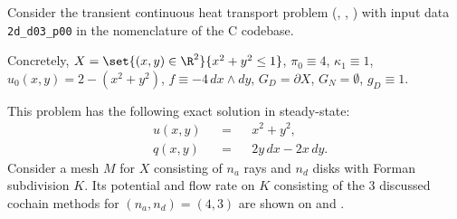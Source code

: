 \begin{example}
  \label{cmc/diffusion/continuous/transient/examples/2d_d03_p00-example}
  Consider the transient continuous heat transport problem
  (,
   ,
   )
  with input data \verb|2d_d03_p00| in the nomenclature of the C codebase.

  Concretely,
    $X = \set{(x, y) \in \R^2}{x^2 + y^2 \leq 1}$,
    $\pi_0 \equiv 4$,
    $\kappa_1 \equiv 1$,
    $u_0(x, y) = 2 - (x^2 + y^2)$,
    $f \equiv -4\, d x \wedge d y$,
    $G_D = \partial X$,
    $G_N = \emptyset$,
    $g_D \equiv 1$.

  This problem has the following exact solution in steady-state:
  \begin{subequations}
    \begin{alignat}{3}
      & u(x, y) && = && x^2 + y^2, \\
      & q(x, y) && = && 2 y\, d x - 2 x\, d y.
    \end{alignat}
  \end{subequations}
  Consider a mesh $M$ for $X$ consisting of $n_a$ rays and $n_d$ disks
  with Forman subdivision $K$.
  Its potential and flow rate on $K$ consisting of the $3$ discussed cochain
  methods for $(n_a, n_d) = (4, 3)$ are shown on
  and
  .
\end{example}
